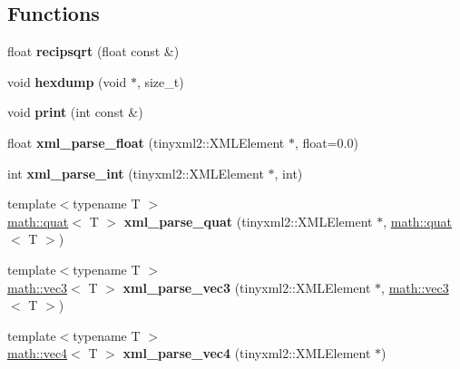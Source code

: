 \subsection*{Functions}
\begin{DoxyCompactItemize}
\item 
\hypertarget{namespacemath_aab0f4b6e5450449993509452ec3f5346}{
float {\bfseries recipsqrt} (float const \&)}
\label{namespacemath_aab0f4b6e5450449993509452ec3f5346}

\item 
\hypertarget{namespacemath_ae4ed1a3349ed01004dec19f19339135e}{
void {\bfseries hexdump} (void $\ast$, size\_\-t)}
\label{namespacemath_ae4ed1a3349ed01004dec19f19339135e}

\item 
\hypertarget{namespacemath_a144127efcc97b1934306ac15a5f6d66d}{
void {\bfseries print} (int const \&)}
\label{namespacemath_a144127efcc97b1934306ac15a5f6d66d}

\item 
\hypertarget{namespacemath_ab9802128cbb57942e824fc6b76b22d01}{
float {\bfseries xml\_\-parse\_\-float} (tinyxml2::XMLElement $\ast$, float=0.0)}
\label{namespacemath_ab9802128cbb57942e824fc6b76b22d01}

\item 
\hypertarget{namespacemath_ad4adf80e60869a4d59af0792ba311be2}{
int {\bfseries xml\_\-parse\_\-int} (tinyxml2::XMLElement $\ast$, int)}
\label{namespacemath_ad4adf80e60869a4d59af0792ba311be2}

\item 
\hypertarget{namespacemath_a88e4d302b1ad84f6d8cc17d6d8c8cddc}{
{\footnotesize template$<$typename T $>$ }\\\hyperlink{classmath_1_1quat}{math::quat}$<$ T $>$ {\bfseries xml\_\-parse\_\-quat} (tinyxml2::XMLElement $\ast$, \hyperlink{classmath_1_1quat}{math::quat}$<$ T $>$)}
\label{namespacemath_a88e4d302b1ad84f6d8cc17d6d8c8cddc}

\item 
\hypertarget{namespacemath_a9ae63d31c1a65ec2af6af01fd72b5c81}{
{\footnotesize template$<$typename T $>$ }\\\hyperlink{classmath_1_1vec3}{math::vec3}$<$ T $>$ {\bfseries xml\_\-parse\_\-vec3} (tinyxml2::XMLElement $\ast$, \hyperlink{classmath_1_1vec3}{math::vec3}$<$ T $>$)}
\label{namespacemath_a9ae63d31c1a65ec2af6af01fd72b5c81}

\item 
\hypertarget{namespacemath_ac5e70e1710f2395334cf5ecff2e65a65}{
{\footnotesize template$<$typename T $>$ }\\\hyperlink{classmath_1_1vec4}{math::vec4}$<$ T $>$ {\bfseries xml\_\-parse\_\-vec4} (tinyxml2::XMLElement $\ast$)}
\label{namespacemath_ac5e70e1710f2395334cf5ecff2e65a65}


\end{DoxyCompactItemize}
